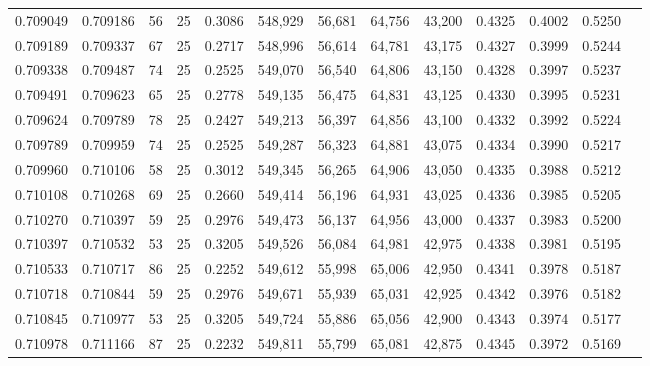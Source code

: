 \begin{tabular}{rrrrrrrrrrrrr}
0.709049 & 0.709186 &    56 &  25 &                                     0.3086 & 548,929 &  56,681 &  64,756 &  43,200 & 0.4325 & 0.4002 & 0.5250 \\
0.709189 & 0.709337 &    67 &  25 &                                     0.2717 & 548,996 &  56,614 &  64,781 &  43,175 & 0.4327 & 0.3999 & 0.5244 \\
0.709338 & 0.709487 &    74 &  25 &                                     0.2525 & 549,070 &  56,540 &  64,806 &  43,150 & 0.4328 & 0.3997 & 0.5237 \\
0.709491 & 0.709623 &    65 &  25 &                                     0.2778 & 549,135 &  56,475 &  64,831 &  43,125 & 0.4330 & 0.3995 & 0.5231 \\
0.709624 & 0.709789 &    78 &  25 &                                     0.2427 & 549,213 &  56,397 &  64,856 &  43,100 & 0.4332 & 0.3992 & 0.5224 \\
0.709789 & 0.709959 &    74 &  25 &                                     0.2525 & 549,287 &  56,323 &  64,881 &  43,075 & 0.4334 & 0.3990 & 0.5217 \\
0.709960 & 0.710106 &    58 &  25 &                                     0.3012 & 549,345 &  56,265 &  64,906 &  43,050 & 0.4335 & 0.3988 & 0.5212 \\
0.710108 & 0.710268 &    69 &  25 &                                     0.2660 & 549,414 &  56,196 &  64,931 &  43,025 & 0.4336 & 0.3985 & 0.5205 \\
0.710270 & 0.710397 &    59 &  25 &                                     0.2976 & 549,473 &  56,137 &  64,956 &  43,000 & 0.4337 & 0.3983 & 0.5200 \\
0.710397 & 0.710532 &    53 &  25 &                                     0.3205 & 549,526 &  56,084 &  64,981 &  42,975 & 0.4338 & 0.3981 & 0.5195 \\
0.710533 & 0.710717 &    86 &  25 &                                     0.2252 & 549,612 &  55,998 &  65,006 &  42,950 & 0.4341 & 0.3978 & 0.5187 \\
0.710718 & 0.710844 &    59 &  25 &                                     0.2976 & 549,671 &  55,939 &  65,031 &  42,925 & 0.4342 & 0.3976 & 0.5182 \\
0.710845 & 0.710977 &    53 &  25 &                                     0.3205 & 549,724 &  55,886 &  65,056 &  42,900 & 0.4343 & 0.3974 & 0.5177 \\
0.710978 & 0.711166 &    87 &  25 &                                     0.2232 & 549,811 &  55,799 &  65,081 &  42,875 & 0.4345 & 0.3972 & 0.5169 \\

\end{tabular}
